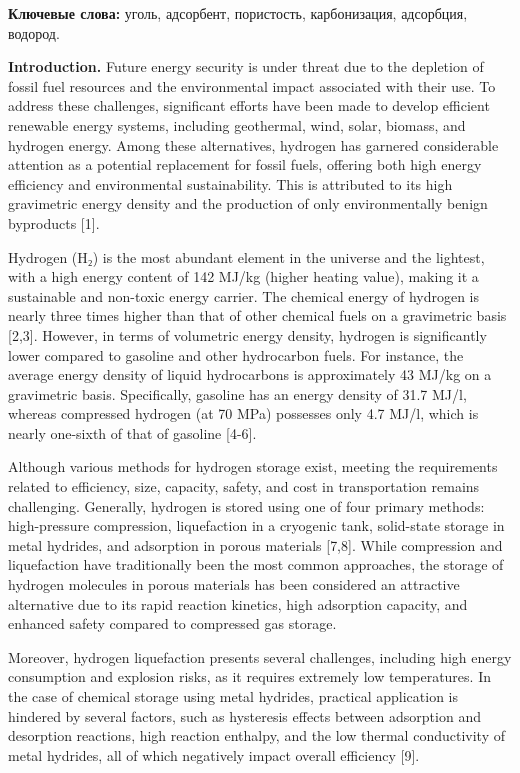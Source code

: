 {\bfseries Ключевые слова:} уголь, адсорбент, пористость, карбонизация,
адсорбция, водород.

\begin{multicols}{2}
{\bfseries Introduction.} Future energy security is under threat due to the
depletion of fossil fuel resources and the environmental impact
associated with their use. To address these challenges, significant
efforts have been made to develop efficient renewable energy systems,
including geothermal, wind, solar, biomass, and hydrogen energy. Among
these alternatives, hydrogen has garnered considerable attention as a
potential replacement for fossil fuels, offering both high energy
efficiency and environmental sustainability. This is attributed to its
high gravimetric energy density and the production of only
environmentally benign byproducts {[}1{]}.

Hydrogen (H₂) is the most abundant element in the universe and the
lightest, with a high energy content of 142 MJ/kg (higher heating
value), making it a sustainable and non-toxic energy carrier. The
chemical energy of hydrogen is nearly three times higher than that of
other chemical fuels on a gravimetric basis {[}2,3{]}. However, in terms
of volumetric energy density, hydrogen is significantly lower compared
to gasoline and other hydrocarbon fuels. For instance, the average
energy density of liquid hydrocarbons is approximately 43 MJ/kg on a
gravimetric basis. Specifically, gasoline has an energy density of 31.7
MJ/l, whereas compressed hydrogen (at 70 MPa) possesses only 4.7 MJ/l,
which is nearly one-sixth of that of gasoline {[}4-6{]}.

Although various methods for hydrogen storage exist, meeting the
requirements related to efficiency, size, capacity, safety, and cost in
transportation remains challenging. Generally, hydrogen is stored using
one of four primary methods: high-pressure compression, liquefaction in
a cryogenic tank, solid-state storage in metal hydrides, and adsorption
in porous materials {[}7,8{]}. While compression and liquefaction have
traditionally been the most common approaches, the storage of hydrogen
molecules in porous materials has been considered an attractive
alternative due to its rapid reaction kinetics, high adsorption
capacity, and enhanced safety compared to compressed gas storage.

Moreover, hydrogen liquefaction presents several challenges, including
high energy consumption and explosion risks, as it requires extremely
low temperatures. In the case of chemical storage using metal hydrides,
practical application is hindered by several factors, such as hysteresis
effects between adsorption and desorption reactions, high reaction
enthalpy, and the low thermal conductivity of metal hydrides, all of
which negatively impact overall efficiency {[}9{]}.


\end{multicols}

